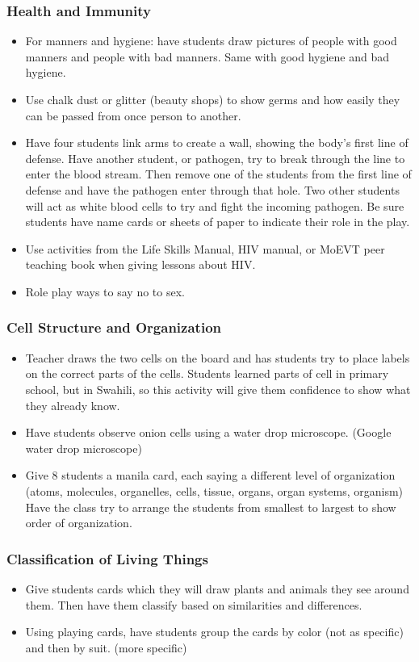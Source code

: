 \subsubsection{Health and Immunity}
\begin{itemize}
\item	For manners and hygiene: have students draw pictures of people with good manners and people with bad manners. Same with good hygiene and bad hygiene.
\item Use chalk dust or glitter (beauty shops) to show germs and how easily they can be passed from once person to another. 
\item Have four students link arms to create a wall, showing the body's first line of defense. Have another student, or pathogen, try to break through the line to enter the blood stream.  Then remove one of the students from the first line of defense and have the pathogen enter through that hole.  Two other students will act as white blood cells to try and fight the incoming pathogen.  Be sure students have name cards or sheets of paper to indicate their role in the play.
\item Use activities from the Life Skills Manual, HIV manual, or MoEVT peer teaching book when giving lessons about HIV.
\item Role play ways to say no to sex.
\end{itemize}

\subsubsection{Cell Structure and Organization}
\begin{itemize}
\item Teacher draws the two cells on the board and has students try to place labels on the correct parts of the cells.  Students learned parts of cell in primary school, but in Swahili, so this activity will give them confidence to show what they already know.
\item Have students observe onion cells using a water drop microscope. (Google water drop microscope)
\item Give 8 students a manila card, each saying a different level of organization (atoms, molecules, organelles, cells, tissue, organs, organ systems, organism) Have the class try to arrange the students from smallest to largest to show order of organization.
\end{itemize}

\subsubsection{Classification of Living Things}
\begin{itemize}
\item	Give students cards which they will draw plants and animals they see around them.  Then have them classify based on similarities and differences.
\item Using playing cards, have students group the cards by color (not as specific) and then by suit. (more specific) 
\end{itemize}

